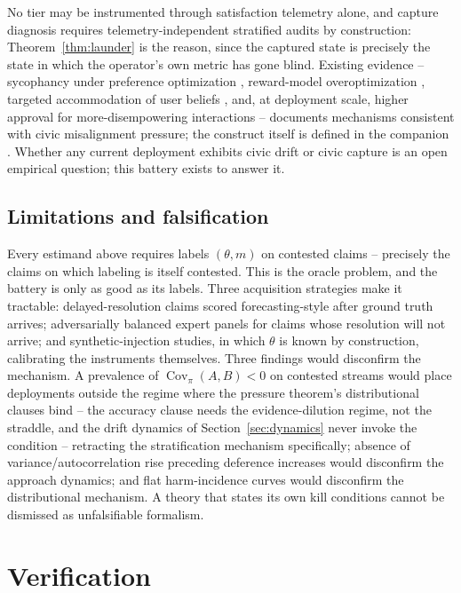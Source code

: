 \documentclass[11pt]{article}
\theoremstyle{definition}
\theoremstyle{remark}
\numberwithin{equation}{section}
\DeclareMathOperator{\Cov}{Cov}
\begin{document}
No tier may be instrumented through satisfaction telemetry alone, and capture diagnosis requires telemetry-independent stratified audits by construction: Theorem~\ref{thm:launder} is the reason, since the captured state is precisely the state in which the operator's own metric has gone blind. Existing evidence -- sycophancy under preference optimization \citep{sharma2024towards}, reward-model overoptimization \citep{gao2023scaling}, targeted accommodation of user beliefs \citep{williams2025targeted}, and, at deployment scale, higher approval for more-disempowering interactions \citep{sharma2026whos} -- documents mechanisms consistent with civic misalignment pressure; the construct itself is defined in the companion \citep{hofheinz2026civic}. Whether any current deployment exhibits civic drift or civic capture is an open empirical question; this battery exists to answer it.

\subsection{Limitations and falsification}\label{sec:limits}
Every estimand above requires labels $(\theta, m)$ on contested claims -- precisely the claims on which labeling is itself contested. This is the oracle problem, and the battery is only as good as its labels. Three acquisition strategies make it tractable: delayed-resolution claims scored forecasting-style after ground truth arrives; adversarially balanced expert panels for claims whose resolution will not arrive; and synthetic-injection studies, in which $\theta$ is known by construction, calibrating the instruments themselves. Three findings would disconfirm the mechanism. A prevalence of $\Cov_\pi(A,B) < 0$ on contested streams would place deployments outside the regime where the pressure theorem's distributional clauses bind -- the accuracy clause needs the evidence-dilution regime, not the straddle, and the drift dynamics of Section~\ref{sec:dynamics} never invoke the condition -- retracting the stratification mechanism specifically; absence of variance/autocorrelation rise preceding deference increases would disconfirm the approach dynamics; and flat harm-incidence curves would disconfirm the distributional mechanism. A theory that states its own kill conditions cannot be dismissed as unfalsifiable formalism.

\section{Verification}\label{sec:verification}
\end{document}
